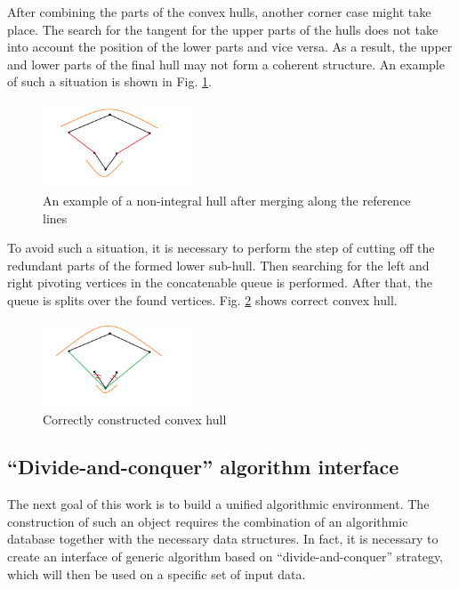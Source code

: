 \documentclass[conference]{IEEEtran}
\theoremstyle{plane}
\begin{document}
		After combining the parts of the convex hulls, another corner case might take place. The search for the tangent for the upper parts of the hulls does not take into account the position of the lower parts and vice versa. As a result, the upper and lower parts of the final hull may not form a coherent structure. An example of such a situation is shown in Fig. \ref{fig:incorect_lower_subhull}.
		
		\begin{figure}[htbp]
			\centerline{\includegraphics[width=0.4\textwidth, height=0.2\textheight]{incorect_lower_subhull}}
			\caption{An example of a non-integral hull after merging along the reference lines}
			\label{fig:incorect_lower_subhull}
		\end{figure}
		
		To avoid such a situation, it is necessary to perform the step of cutting off the redundant parts of the formed lower sub-hull. Then searching for the left and right pivoting vertices in the concatenable queue is performed. After that, the queue is splits over the found vertices.
		Fig. \ref{fig:correct_convex_hull} shows correct convex hull.
		
		\begin{figure}[htbp]
			\centerline{\includegraphics[width=0.4\textwidth, height=0.2\textheight]{correct_convex_hull}}
			\caption{Correctly constructed convex hull}
			\label{fig:correct_convex_hull}
		\end{figure}



\subsection{``Divide-and-conquer'' algorithm interface}


		The next goal of this work is to build a unified algorithmic environment. The construction of such an object requires the combination of an algorithmic database together with the necessary data structures.  In fact, it is necessary to create an interface of generic algorithm based on ``divide-and-conquer'' strategy, which will then be used on a specific set of input data.
		
\end{document}
